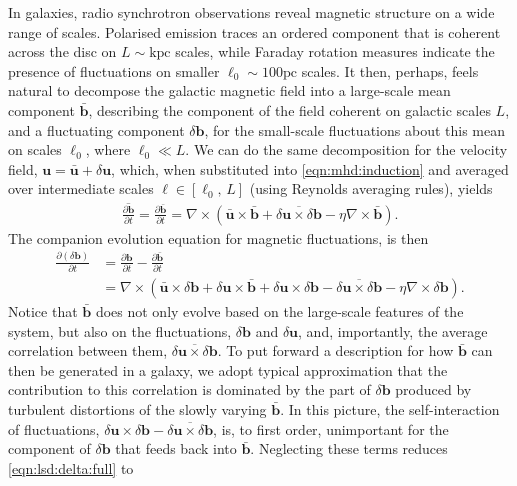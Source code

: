 \documentclass[12pt,twoside]{extreport}
\newcommand{\rbrac}[1]{\left( #1 \right)} %
\newcommand{\mCurl}[1]{\nabla \times #1} %
\newcommand{\mVector}[1]{\bm{#1}} %
\newcommand{\mpp}[1]{\partial #1}
\newcommand{\mppFrac}[2]{\frac{\mpp{#1}}{\mpp{#2}}}
\begin{document}
In galaxies, radio synchrotron observations reveal magnetic structure on a wide range of scales. Polarised emission traces an ordered component that is coherent across the disc on $L \sim \mathrm{kpc}$ scales, while Faraday rotation measures indicate the presence of fluctuations on smaller $\ell_0 \sim 100 \mathrm{pc}$ scales. It then, perhaps, feels natural to decompose the galactic magnetic field into a large-scale mean component $\bar{\mVector{b}}$, describing the component of the field coherent on galactic scales $L$, and a fluctuating component $\delta\mVector{b}$, for the small-scale fluctuations about this mean on scales $\ell_0$, where $\ell_0 \ll L$. We can do the same decomposition for the velocity field, $\mVector{u} = \bar{\mVector{u}} + \delta\mVector{u}$, which, when substituted into \autoref{eqn:mhd:induction} and averaged over intermediate scales $\ell \in [\ell_0, \,L]$ (using Reynolds averaging rules), yields
\begin{align}
    \overline{\mppFrac{\mVector{b}}{t}}
        =  \mppFrac{\bar{\mVector{b}}}{t}
        = \mCurl{\rbrac{
            \bar{\mVector{u}} \times \bar{\mVector{b}}
            + \overline{\delta\mVector{u} \times \delta\mVector{b}}
            - \eta \mCurl{\bar{\mVector{b}}}
        }}
        . \label{eqn:lsd:average}
\end{align}
The companion evolution equation for magnetic fluctuations, is then
\begin{align}
    \mppFrac{(\delta\mVector{b})}{t}
        &= \mppFrac{\mVector{b}}{t} - \mppFrac{\bar{\mVector{b}}}{t} \\
        &= \mCurl{\rbrac{
            \bar{\mVector{u}}\times\delta\mVector{b}
            + \delta\mVector{u}\times\bar{\mVector{b}}
            + \delta\mVector{u}\times\delta\mVector{b}
            - \overline{\delta\mVector{u}\times\delta\mVector{b}}
            - \eta \mCurl{\delta\mVector{b}}
        }}
    . \label{eqn:lsd:delta:full}
\end{align}
Notice that $\bar{\mVector{b}}$ does not only evolve based on the large-scale features of the system, but also on the fluctuations, $\delta\mVector{b}$ and $\delta\mVector{u}$, and, importantly, the average correlation between them, $\overline{\delta\mVector{u}\times\delta\mVector{b}}$. To put forward a description for how $\bar{\mVector{b}}$ can then be generated in a galaxy, we adopt typical approximation that the contribution to this correlation is dominated by the part of $\delta\mVector{b}$ produced by turbulent distortions of the slowly varying $\bar{\mVector{b}}$. In this picture, the self-interaction of fluctuations, $ \delta\mVector{u}\times\delta\mVector{b} - \overline{\delta\mVector{u}\times\delta\mVector{b}} $, is, to first order, unimportant for the component of $\delta\mVector{b}$ that feeds back into $\bar{\mVector{b}}$. Neglecting these terms reduces \autoref{eqn:lsd:delta:full} to
\end{document}
